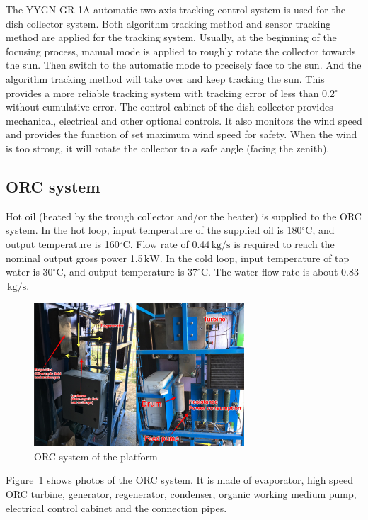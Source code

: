 The YYGN-GR-1A automatic two-axis tracking control system is used for the dish collector system. Both algorithm tracking method and sensor tracking method are applied for the tracking system. Usually, at the beginning of the focusing process, manual mode is applied to roughly rotate the collector towards the sun. Then switch to the automatic mode to precisely face to the sun. And the algorithm tracking method will take over and keep tracking the sun. This provides a more reliable tracking system with tracking error of less than 0.2$^\circ$ without cumulative error.
The control cabinet of the dish collector provides mechanical, electrical and other optional controls. It also monitors the wind speed and provides the function of set maximum wind speed for safety. When the wind is too strong, it will rotate the collector to a safe angle (facing the zenith).

\subsection{ORC system}
Hot oil (heated by the trough collector and/or the heater) is supplied to the ORC system. 
In the hot loop, input temperature of the supplied oil is 180$\mathrm{^\circ C}$, and output temperature is 160$\mathrm{^\circ C}$. Flow rate of 0.44$\,\mathrm{kg/s}$ is required to reach the nominal output gross power 1.5$\,\mathrm{kW}$. In the cold loop, input temperature of tap water is 30$\mathrm{^\circ C}$, and output temperature is 37$\mathrm{^\circ C}$. The water flow rate is about 0.83$\,\mathrm{kg/s}$.

\begin{figure}[!ht]
\centering
\includegraphics[width=0.7\textwidth]{fig/ORCsystem.jpg}
\caption{ORC system of the platform}\label{fig:ORCsystem}
\end{figure}
Figure~\ref{fig:ORCsystem} shows photos of the ORC system. It is made of evaporator, high speed ORC turbine, generator, regenerator, condenser, organic working medium pump, electrical control cabinet and the connection pipes.

